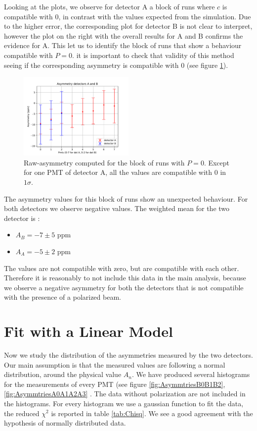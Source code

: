 Looking at the plots, we observe for detector A a block of runs where $c$ is compatible with 0, in contrast with the values expected from the simulation. Due to the higher error, the corresponding plot for detector B is not clear to interpret, however the plot on the right with the overall results for A and B confirms the evidence for A.
This let us to identify the block of runs that show a behaviour compatible with $P = 0$. it is important to check that validity of this method seeing if the corresponding asymmetry is compatible with $0$ (see figure \ref{fig:ZeroAsym}).

\begin{figure}[hbtp]
\centering
\includegraphics[width= 0.5\textwidth]{Analysis/Dataselection/Nopolarity.pdf}
\caption{Raw-asymmetry computed for the block of runs with $P = 0$. Except for one PMT of detector A, all the values are compatible with $0$ in $1\sigma$.}
\label{fig:ZeroAsym}
\end{figure}

The asymmetry values for this block of runs show an unexpected behaviour. For both detectors we observe negative values. The weighted mean for the two detector is :
\begin{itemize}
\item $A_{B} = -7 \pm 5$ ppm
\item $A_{A} = -5 \pm 2$ ppm
\end{itemize}

The values are not compatible with zero, but are compatible with each other. Therefore it is reasonably to not include this data in the main analysis, because we observe a negative asymmetry for both the detectors that is not compatible with the presence of a polarized beam.

\section{Fit with a Linear Model}

Now we study the distribution of the asymmetries measured by the two detectors. Our main assumption is that the measured values are following a normal distribution, around the physical value $A_{n}$. We have produced several histograms for the measurements of every PMT (see figure \ref{fig:AsymmtriesB0B1B2},\ref{fig:AsymmtriesA0A1A2A3} . The data without polarization are not included in the histograms. For every histogram we use a gaussian function to fit the data, the reduced $\chi^{2}$ is reported in table \ref{tab:Chisq}. We see a good agreement with the hypothesis of normally distributed data.

